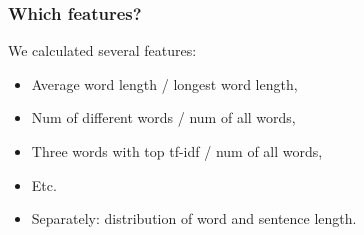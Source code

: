 \documentclass[unknownkeysallowed]{beamer}
\begin{document}
\begin{frame}
\frametitle{Which features?}
We calculated several features:
\medskip
\begin{itemize}
\smallskip
\item Average word length / longest word length,
\bigskip
\item Num of different words / num of all words,
\bigskip
\item Three words with top tf-idf / num of all words,
\bigskip
\item Etc.
\bigskip
\item Separately: distribution of word and sentence length.
\end{itemize}

\end{frame}
\end{document}
